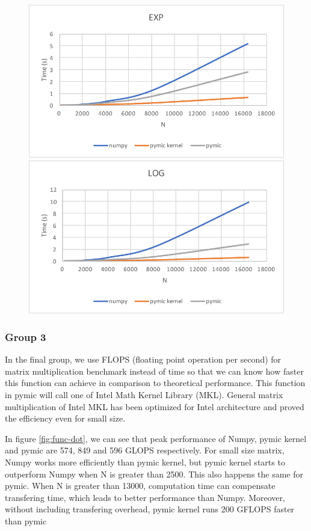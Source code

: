\begin{figure}[]
\includegraphics[scale=0.5]{img/group2/exp.pdf}
\includegraphics[scale=0.5]{img/group2/log.pdf}
\end{figure}

\subsubsection{Group 3}
In the final group, we use FLOPS (floating point operation per second) for matrix multiplication benchmark instead of time so that we can know how faster this function can achieve in comparison to theoretical performance. This function in pymic will call one of Intel Math Kernel Library (MKL). General matrix multiplication of Intel MKL has been optimized for Intel architecture and proved the efficiency even for small size. 

In figure \ref{fig:func-dot}, we can see that peak performance of Numpy, pymic kernel and pymic are 574, 849 and 596 GLOPS respectively. For small size matrix, Numpy works more efficiently than pymic kernel, but pymic kernel starts to outperform Numpy when N is greater than 2500. This also happens the same for pymic. When N is greater than 13000, computation time can compensate transfering time, which leads to better performance than Numpy. Moreover, without including transfering overhead, pymic kernel runs 200 GFLOPS faster than pymic

